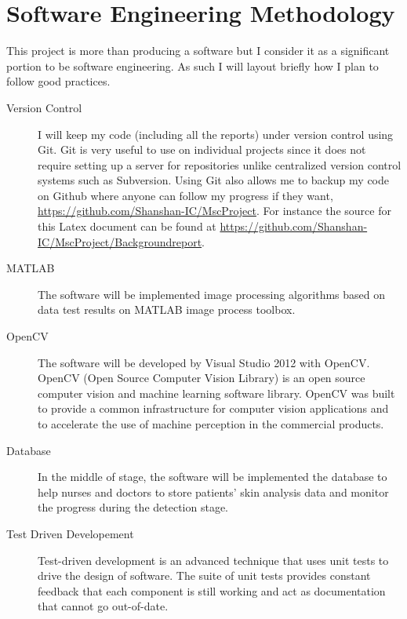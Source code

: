 \appendix
\chapter{Software Engineering Methodology} \label{app:sem}
This project is more than producing a software but I consider it as a significant portion to be software engineering.  As such I will layout briefly how I plan to follow good practices. 

\begin{description}
\item[Version Control] I will keep my code (including all the reports) under version control using Git. Git is very useful to use on individual projects since it does not require setting up a server for repositories unlike centralized version control systems such as Subversion. Using Git also allows me to backup my code on Github where anyone can follow my progress if they want, \url{https://github.com/Shanshan-IC/MscProject}. 
For instance the source for this Latex document can be found at \url{https://github.com/Shanshan-IC/MscProject/Backgroundreport}.

\item[MATLAB] The software will be implemented image processing algorithms based on data test results on MATLAB image process toolbox.


\item[OpenCV] The software will be developed by Visual Studio 2012 with OpenCV. OpenCV (Open Source Computer Vision Library) is an open source computer vision and machine learning software library. OpenCV was built to provide a common infrastructure for computer vision applications and to accelerate the use of machine perception in the commercial products.

\item[Database] In the middle of stage, the software will be implemented the database to help nurses and doctors to store patients' skin analysis data and monitor the progress during the detection stage.

\item[Test Driven Developement] Test-driven development is an advanced technique that uses unit tests to drive the design of software. The suite of unit tests provides constant feedback that each component is still working and act as documentation that cannot go out-of-date.

\end{description}
